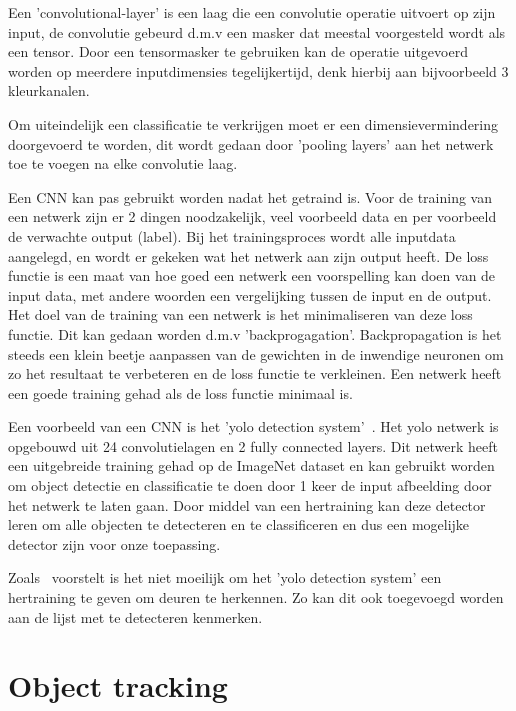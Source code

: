             Een 'convolutional-layer' is een laag die een convolutie operatie uitvoert op zijn input, de convolutie gebeurd d.m.v een masker dat meestal voorgesteld wordt als een tensor.
            Door een tensormasker te gebruiken kan de operatie uitgevoerd worden op meerdere inputdimensies tegelijkertijd, denk hierbij aan bijvoorbeeld 3 kleurkanalen.

            Om uiteindelijk een classificatie te verkrijgen moet er een dimensievermindering doorgevoerd te worden, dit wordt gedaan door 'pooling layers' aan het netwerk toe te voegen na elke convolutie laag. 

            Een CNN kan pas gebruikt worden nadat het getraind is. Voor de training van een netwerk zijn er 2 dingen noodzakelijk, veel voorbeeld data en per voorbeeld de verwachte output (label).
            Bij het trainingsproces wordt alle inputdata aangelegd, en wordt er gekeken wat het netwerk aan zijn output heeft.
            De loss functie is een maat van hoe goed een netwerk een voorspelling kan doen van de input data, met andere woorden een vergelijking tussen de input en de output. Het doel van de training van een netwerk is het minimaliseren
            van deze loss functie. Dit kan gedaan worden d.m.v 'backprogagation'. Backpropagation is het steeds een klein beetje aanpassen van de gewichten in de inwendige neuronen om zo het resultaat te verbeteren en de loss functie te verkleinen.
            Een netwerk heeft een goede training gehad als de loss functie minimaal is.

            Een voorbeeld van een CNN is het '\gls{yolo} detection system'~\cite{Redmon_2016}. Het \gls{yolo} netwerk is opgebouwd uit 24 convolutielagen en 2 fully connected layers.
            Dit netwerk heeft een uitgebreide training gehad op de ImageNet dataset en kan gebruikt worden om object detectie en classificatie te doen door 1 keer de input afbeelding door het netwerk te laten gaan.
            Door middel van een hertraining kan deze detector leren om alle objecten te detecteren en te classificeren en dus een mogelijke detector zijn voor onze toepassing.

            Zoals~\cite{Llopart2017} voorstelt is het niet moeilijk om het '\gls{yolo} detection system' een hertraining te geven om deuren te herkennen. Zo kan dit ook toegevoegd worden aan de lijst met te detecteren kenmerken. 
            

    \section{Object tracking}

